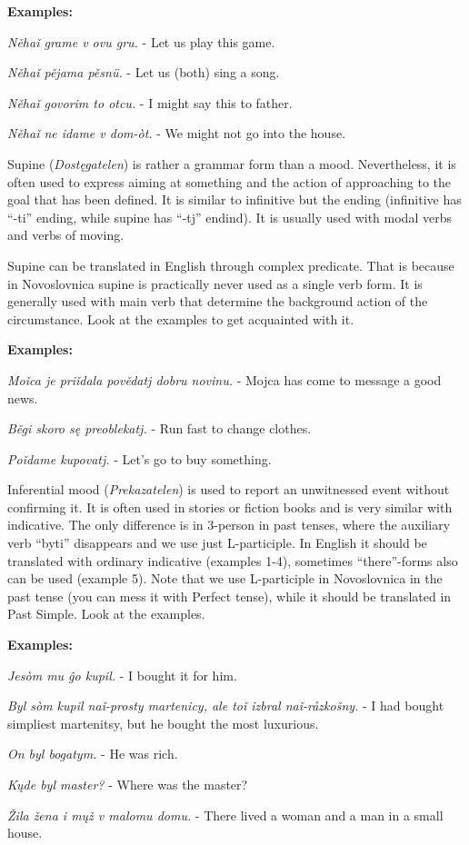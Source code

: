 \textbf{Examples:}

\textit{Něhaǐ grame v ovu gru.} - Let us play this game.

\textit{Něhaǐ pějama pěsnü.} - Let us (both) sing a song.

\textit{Něhaǐ govorim to otcu.} - I might say this to father.

\textit{Něhaǐ ne idame v dom-òt.} - We might not go into the house.


Supine (\textit{Dostęgatelen}) is rather a grammar form than a mood. Nevertheless, it is often used to express aiming at something and the action of approaching to the goal that has been defined. It is similar to infinitive but the ending (infinitive has “-ti” ending, while supine has “-tj” endind). It is usually used with modal verbs and verbs of moving.

Supine can be translated in English through complex predicate. That is because in Novoslovnica supine is practically never used as a single verb form. It is generally used with main verb that determine the background action of the circumstance. Look at the examples to get acquainted with it.

\textbf{Examples:}

\textit{Moǐca je priǐdala povědatj dobru novinu.} - Mojca has come to message a good news.

\textit{Běgi skoro sę preoblekatj.} - Run fast to change clothes.

\textit{Poǐdame kupovatj.} - Let’s go to buy something.

Inferential mood (\textit{Prekazatelen}) is used to report an unwitnessed event without confirming it. It is often used in stories or fiction books and is very similar with indicative. The only difference is in 3-person in past tenses, where the auxiliary verb “byti” disappears and we use just L-participle. In English it should be translated with ordinary indicative (examples 1-4), sometimes “there”-forms also can be used (example 5). Note that we use L-participle in Novoslovnica in the past tense (you can mess it with Perfect tense), while it should be translated in Past Simple.
Look at the examples.

\textbf{Examples:}

\textit{Jesòm mu ĝo kupil.} - I bought it for him.

\textit{Byl sòm kupil naǐ-prosty martenicy, ale toǐ izbral naǐ-råzkošny.} - I had bought simpliest martenitsy, but he bought the most luxurious.

\textit{On byl bogatym.} - He was rich.

\textit{Kųde byl master?} - Where was the master?

\textit{Žila žena i mųž v malomu domu.} - There lived a woman and a man in a small house.
